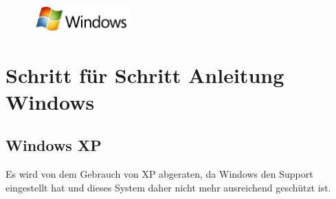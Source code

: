 \documentclass[a4paper,12pt]{scrartcl}
\begin{document}
\begin{figure}[h]
	\raggedleft
	\vspace{-20pt}
	\includegraphics[height=1cm,keepaspectratio]{Bilder/Windows_logo}
	\vspace{-30pt}
\end{figure}

\section*{Schritt für Schritt Anleitung Windows}
\subsection*{Windows XP}
Es wird von dem Gebrauch von XP abgeraten, da Windows den Support eingestellt hat und dieses System daher nicht mehr ausreichend geschützt ist. 
\end{document}
